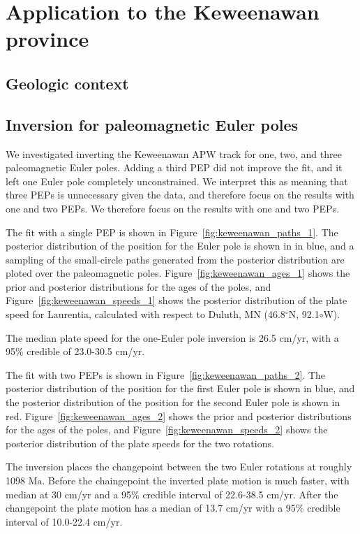 \documentclass[preprint,12pt,authoryear]{elsarticle}
\begin{document}
\section{Application to the Keweenawan province}
\label{sec:keweenawan}
\subsection{Geologic context}
\citet{swanson2009no}
\subsection{Inversion for paleomagnetic Euler poles}
\clearpage

\begin{landscape}

\end{landscape}

We investigated inverting the Keweenawan APW track for one, two, and three paleomagnetic Euler poles.
Adding a third PEP did not improve the fit, and it left one Euler pole completely unconstrained.
We interpret this as meaning that three PEPs is unnecessary given the data, and therefore focus
on the results with one and two PEPs.
We therefore focus on the results with one and two PEPs.

The fit with a single PEP is shown in Figure~\ref{fig:keweenawan_paths_1}.
The posterior distribution of the position for the Euler pole is shown in in blue,
and a sampling of the small-circle paths generated from the posterior distribution are ploted over the paleomagnetic poles.
Figure~\ref{fig:keweenawan_ages_1} shows the prior and posterior distributions for the ages of the poles,
and Figure~\ref{fig:keweenawan_speeds_1} shows the posterior distribution of the plate speed for Laurentia,
calculated with respect to Duluth, MN (46.8$^\circ$N, 92.1$\circ$W).

The median plate speed for the one-Euler pole inversion is 26.5 cm/yr, with a 95\% credible of 23.0-30.5 cm/yr.

The fit with two PEPs is shown in Figure~\ref{fig:keweenawan_paths_2}.
The posterior distribution of the position for the first Euler pole is shown in blue,
and the posterior distribution of the position for the second Euler pole is shown in red.
Figure~\ref{fig:keweenawan_ages_2} shows the prior and posterior distributions for the ages of the poles,
and Figure~\ref{fig:keweenawan_speeds_2} shows the posterior distribution of the plate speeds for the two rotations.

The inversion places the changepoint between the two Euler rotations at roughly 1098 Ma.
Before the chaingepoint the inverted plate motion is much faster, with median at 30 cm/yr
and a 95\% credible interval of 22.6-38.5 cm/yr. After the changepoint the plate motion has a median
of 13.7 cm/yr with a 95\% credible interval of 10.0-22.4 cm/yr.
\end{document}
